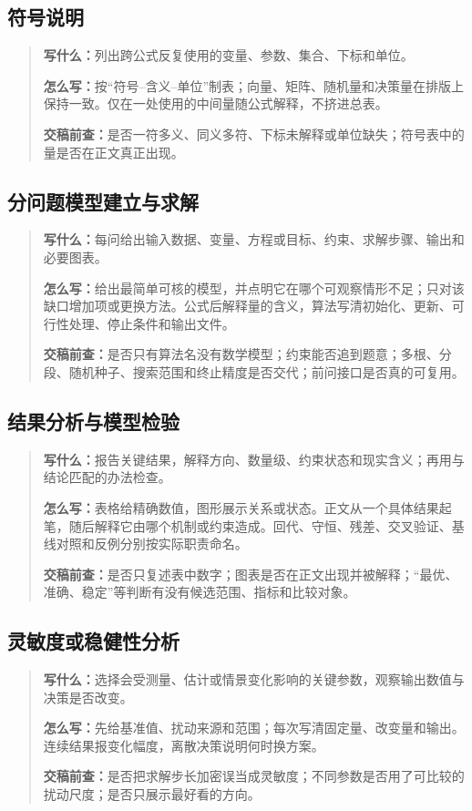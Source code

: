 \documentclass[UTF8,zihao=-4]{ctexart}
\newenvironment{writeguide}
  {\begin{quote}\small\color{black}}
  {\end{quote}}
\newcommand{\guideitem}[2]{%
  \par\noindent\textbf{\color{inkblue}#1：}\ignorespaces #2\par
}
\begin{document}
\subsection{符号说明}
\begin{writeguide}
\guideitem{写什么}{列出跨公式反复使用的变量、参数、集合、下标和单位。}
\guideitem{怎么写}{按“符号--含义--单位”制表；向量、矩阵、随机量和决策量在排版上保持一致。仅在一处使用的中间量随公式解释，不挤进总表。}
\guideitem{交稿前查}{是否一符多义、同义多符、下标未解释或单位缺失；符号表中的量是否在正文真正出现。}
\end{writeguide}

\subsection{分问题模型建立与求解}
\begin{writeguide}
\guideitem{写什么}{每问给出输入数据、变量、方程或目标、约束、求解步骤、输出和必要图表。}
\guideitem{怎么写}{给出最简单可核的模型，并点明它在哪个可观察情形不足；只对该缺口增加项或更换方法。公式后解释量的含义，算法写清初始化、更新、可行性处理、停止条件和输出文件。}
\guideitem{交稿前查}{是否只有算法名没有数学模型；约束能否追到题意；多根、分段、随机种子、搜索范围和终止精度是否交代；前问接口是否真的可复用。}
\end{writeguide}

\subsection{结果分析与模型检验}
\begin{writeguide}
\guideitem{写什么}{报告关键结果，解释方向、数量级、约束状态和现实含义；再用与结论匹配的办法检查。}
\guideitem{怎么写}{表格给精确数值，图形展示关系或状态。正文从一个具体结果起笔，随后解释它由哪个机制或约束造成。回代、守恒、残差、交叉验证、基线对照和反例分别按实际职责命名。}
\guideitem{交稿前查}{是否只复述表中数字；图表是否在正文出现并被解释；“最优、准确、稳定”等判断有没有候选范围、指标和比较对象。}
\end{writeguide}

\subsection{灵敏度或稳健性分析}
\begin{writeguide}
\guideitem{写什么}{选择会受测量、估计或情景变化影响的关键参数，观察输出数值与决策是否改变。}
\guideitem{怎么写}{先给基准值、扰动来源和范围；每次写清固定量、改变量和输出。连续结果报变化幅度，离散决策说明何时换方案。}
\guideitem{交稿前查}{是否把求解步长加密误当成灵敏度；不同参数是否用了可比较的扰动尺度；是否只展示最好看的方向。}
\end{writeguide}
\end{document}

